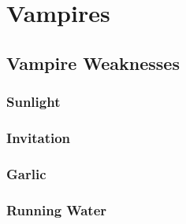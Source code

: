 \chapter{Vampires}

\section{Vampire Weaknesses}

\subsection{Sunlight}



\subsection{Invitation}



\subsection{Garlic}



\subsection{Running Water}


